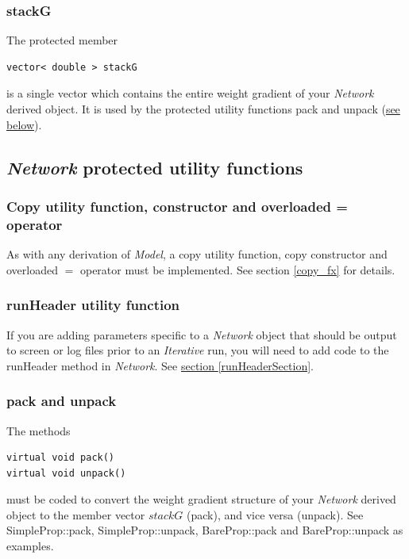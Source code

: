 \documentclass{report}
\begin{document}
\subsubsection{stackG}

The protected member

\begin{verbatim}
vector< double > stackG
\end{verbatim}

is a single vector which contains the entire weight gradient of your
{\em Network} derived object.  It is used by the protected utility
functions pack and unpack (\hyperref[packutil]{see below}).

\subsection{{\em Network} protected utility functions}

\subsubsection{Copy utility function, constructor and overloaded =
operator}

As with any derivation of {\em Model}, a copy utility function, copy
constructor and overloaded $=$ operator must be implemented.  See
section \ref{copy_fx} for details.

\subsubsection{runHeader utility function}

If you are adding parameters specific to a {\em Network} object that
should be output to screen or log files prior to an {\em Iterative}
run,
you will need to add code to the runHeader method in {\em Network}.
See \hyperref[runHeaderSection]{section \ref{runHeaderSection}}.

\subsubsection{pack and unpack}\label{packutil}

The methods

\begin{verbatim}
virtual void pack()
virtual void unpack()
\end{verbatim}

must be coded to convert the weight gradient structure of your {\em
Network} derived object to the member vector $stackG$ (pack), and vice
versa (unpack).  See SimpleProp::pack, SimpleProp::unpack,
BareProp::pack and BareProp::unpack as examples.
\end{document}
